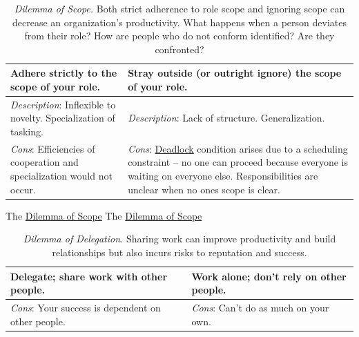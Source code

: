 \begin{center}
\begin{table}[H] %
\begin{tabular}{ | m{\dilemmatablewidth}| m{\dilemmatablewidth} | }
  \hline
  \textbf{Adhere strictly to the scope of your role.} & 
  \textbf{Stray outside (or outright ignore) the scope of your role.} \\ 
  \hline
  \textit{Description}: Inflexible to novelty. Specialization of tasking. & 
  \textit{Description}: Lack of structure. Generalization. \\ 
  \hline
  \textit{Cons}: Efficiencies of cooperation and specialization would not occur. & 
  \textit{Cons}: \href{https://en.wikipedia.org/wiki/Deadlock}{Deadlock} condition arises due to a scheduling constraint -- no one can proceed because everyone is waiting on everyone else. Responsibilities are unclear when no ones scope is clear. \\  
  \hline
\end{tabular}
\caption{
\textit{Dilemma of Scope.}
Both strict adherence to role scope and ignoring scope can decrease an organization's productivity. 
What happens when a person deviates from their role?
How are people who do not conform identified? Are they confronted?
}
\label{table:scope_of_activity}
\end{table}
\end{center}


The \href{table:scope_of_activity}{Dilemma of Scope}
The \href{table:scope_of_activity}{Dilemma of Scope}


\begin{center}
\begin{table}[H] %
\begin{tabular}{ | m{\dilemmatablewidth}| m{\dilemmatablewidth} | } 
  \hline
  \textbf{Delegate; share work with other people.} & 
  \textbf{Work alone; don't rely on other people.} \\ 
  \hline
  \textit{Cons}: Your success is dependent on other people. & 
  \textit{Cons}: Can't do as much on your own. \\  
  \hline
\end{tabular}
\caption{
\textit{Dilemma of Delegation.}
Sharing work can improve productivity and build relationships but also incurs risks to reputation and success.
}
\label{table:delegate-or-not}
\end{table}
\end{center}


